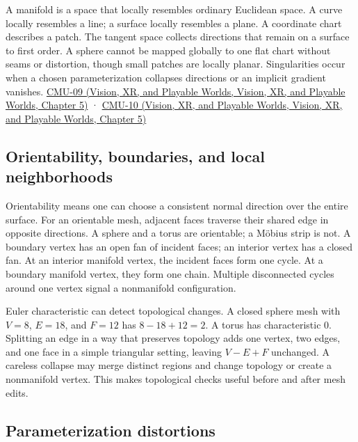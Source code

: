 A manifold is a space that locally resembles ordinary Euclidean space. A curve locally resembles a line; a surface locally resembles a plane. A coordinate chart describes a patch. The tangent space collects directions that remain on a surface to first order. A sphere cannot be mapped globally to one flat chart without seams or distortion, though small patches are locally planar. Singularities occur when a chosen parameterization collapses directions or an implicit gradient vanishes. \href{../07-Vision-XR-and-Playable-Worlds/main.pdf\#nameddest=04-visual-computing-ii-ch036-cmu-09---introduction-to-geometry}{CMU-09 (Vision, XR, and Playable Worlds, Vision, XR, and Playable Worlds, Chapter 5)} · \href{../07-Vision-XR-and-Playable-Worlds/main.pdf\#nameddest=04-visual-computing-ii-ch036-cmu-10---meshes-and-manifolds}{CMU-10 (Vision, XR, and Playable Worlds, Vision, XR, and Playable Worlds, Chapter 5)}

\subsection{Orientability, boundaries, and local neighborhoods}\label{03-visual-computing-i-ch002-orientability-boundaries-and-local-neighborhoods}

Orientability means one can choose a consistent normal direction over the entire surface. For an orientable mesh, adjacent faces traverse their shared edge in opposite directions. A sphere and a torus are orientable; a Möbius strip is not. A boundary vertex has an open fan of incident faces; an interior vertex has a closed fan. At an interior manifold vertex, the incident faces form one cycle. At a boundary manifold vertex, they form one chain. Multiple disconnected cycles around one vertex signal a nonmanifold configuration.

Euler characteristic can detect topological changes. A closed sphere mesh with \(V=8\), \(E=18\), and \(F=12\) has \(8-18+12=2\). A torus has characteristic 0. Splitting an edge in a way that preserves topology adds one vertex, two edges, and one face in a simple triangular setting, leaving \(V-E+F\) unchanged. A careless collapse may merge distinct regions and change topology or create a nonmanifold vertex. This makes topological checks useful before and after mesh edits.

\subsection{Parameterization distortions}\label{03-visual-computing-i-ch002-parameterization-distortions}

